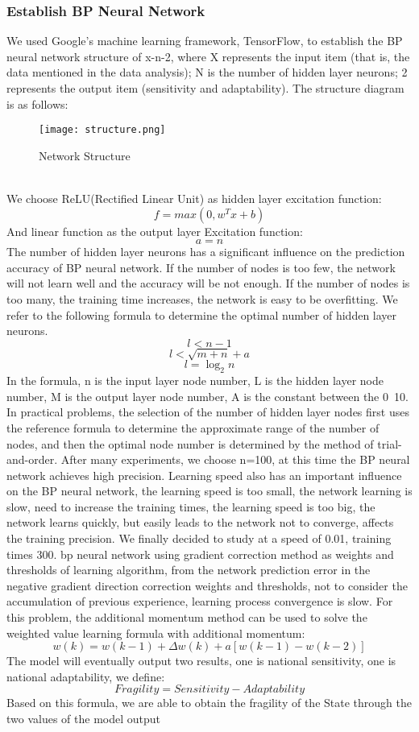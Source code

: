 \documentclass{mcmthesis}
\begin{document}
\subsubsection{Establish BP Neural Network}
We used Google's machine learning framework, TensorFlow, to establish the BP 
neural network structure of x-n-2, where X represents the input item (that is, 
the data mentioned in the data analysis); N is the number of hidden layer neurons; 2 
represents the output item (sensitivity and adaptability). The structure diagram is 
as follows:
\begin{figure}[h]
\small
\centering
\texttt{[image: structure.png]}
\caption{Network Structure} 
\label{fig:ns}
\end{figure}\\
We choose ReLU(Rectified Linear Unit) as hidden layer excitation function:
\[ f=max\left ( 0,w^{T}x+b \right ) \]
And linear function as the output layer Excitation function:
\[ a=n \]
The number of hidden layer neurons has a significant influence on 
the prediction accuracy of BP neural network. If the number of 
nodes is too few, the network will not learn well and the accuracy 
will be not enough. If the number of nodes is too many, the 
training time increases, the network is easy to be overfitting. 
We refer to the following formula to determine the optimal number 
of hidden layer neurons.
\[ l< n-1 \]
\[ l<\sqrt{m+n}+a \]
\[ l=\log_{2} n \]
In the formula, n is the input layer node number, L is the hidden 
layer node number, M is the output layer node number, A is the constant 
between the 0~10. In practical problems, the selection of the number 
of hidden layer nodes first uses the reference formula to determine 
the approximate range of the number of nodes, and then the optimal 
node number is determined by the method of trial-and-order. After 
many experiments, we choose n=100, at this time the BP neural network 
achieves high precision. Learning speed also has an important influence 
on the BP neural network, the learning speed is too small, the 
network learning is slow, need to increase the training times, the 
learning speed is too big, the network learns quickly, but easily 
leads to the network not to converge, affects the training precision. 
We finally decided to study at a speed of 0.01, training times 300. 
bp neural network using gradient correction method as weights and 
thresholds of learning algorithm, from the network prediction error 
in the negative gradient direction correction weights and thresholds, 
not to consider the accumulation of previous experience, learning 
process convergence is slow. For this problem, the additional momentum 
method can be used to solve the weighted value learning formula 
with additional momentum:
\[ w\left ( k \right )=
w\left ( k-1 \right )+\Delta w\left 
( k \right )+a\left [ w\left ( k-1 \right )-w\left 
( k-2 \right ) \right ] \]
The model will eventually output two results, one is national 
sensitivity, one is national adaptability, we define:
\[ Fragility = Sensitivity - Adaptability \]
Based on this formula, we are able to obtain the 
fragility of the State through the two values of the model output
\end{document}
